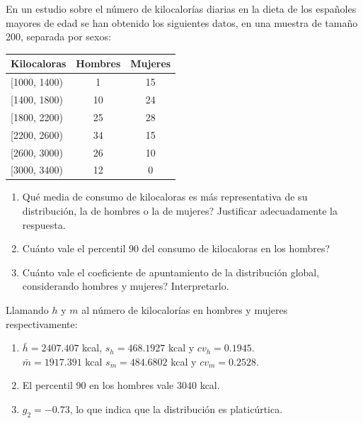{En un estudio sobre el número de kilocalorías diarias en la dieta de los españoles mayores de edad se han obtenido los siguientes datos, en
una muestra de tamaño 200, separada por sexos:
\begin{center}
\begin{tabular}{|l|c|c|}
\hline
Kilocaloras & Hombres & Mujeres \\
\hline
[1000, 1400) & 1 & 15\\
\hline
[1400, 1800) & 10 & 24\\
\hline
[1800, 2200) & 25 & 28\\
\hline
[2200, 2600) & 34 & 15\\
\hline
[2600, 3000) & 26 & 10\\
\hline
[3000, 3400) & 12 & 0\\
\hline
\end{tabular}
\end{center}

\begin{enumerate}
\item Qué media de consumo de kilocaloras es más representativa de su distribución, la de hombres o la de mujeres? Justificar adecuadamente
la respuesta.
\item Cuánto vale el percentil 90 del consumo de kilocaloras en los hombres?
\item Cuánto vale el coeficiente de apuntamiento de la distribución global, considerando hombres y mujeres? Interpretarlo.
\end{enumerate}
}
{Llamando $h$ y $m$ al número de kilocalorías en hombres y mujeres respectivamente:
\begin{enumerate}
\item $\bar h=2407.407$ kcal, $s_h=468.1927$ kcal y $cv_h=0.1945$.\\
$\bar m=1917.391$ kcal  $s_m=484.6802$ kcal y $cv_m=0.2528$.
\item El percentil 90 en los hombres vale $3040$ kcal. 
\item $g_2=-0.73$, lo que indica que la distribución es platicúrtica. 
\end{enumerate}
}
{}


